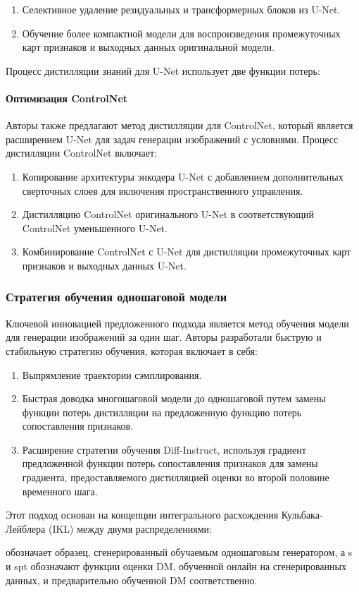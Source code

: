 \begin{enumerate}
    \item  Селективное удаление резидуальных и трансформерных блоков из U-Net.
    \item  Обучение более компактной модели для воспроизведения промежуточных карт признаков и выходных данных оригинальной модели.
\end{enumerate}

Процесс дистилляции знаний для U-Net использует две функции потерь:



\paragraph{Оптимизация ControlNet}

Авторы также предлагают метод дистилляции для ControlNet, который является расширением U-Net для задач генерации изображений с условиями. Процесс дистилляции ControlNet включает:

\begin{enumerate}
    \item Копирование архитектуры энкодера U-Net с добавлением дополнительных сверточных слоев для включения пространственного управления.
    \item Дистилляцию ControlNet оригинального U-Net в соответствующий ControlNet уменьшенного U-Net.
    \item Комбинирование ControlNet с U-Net для дистилляции промежуточных карт признаков и выходных данных U-Net.
\end{enumerate}

\subsubsection{Стратегия обучения одношаговой модели}

Ключевой инновацией предложенного подхода является метод обучения модели для генерации изображений за один шаг. Авторы разработали быструю и стабильную стратегию обучения, которая включает в себя:

\begin{enumerate}
    \item Выпрямление траектории сэмплирования.
    \item Быстрая доводка многошаговой модели до одношаговой путем замены функции потерь дистилляции на предложенную функцию потерь сопоставления признаков.
    \item Расширение стратегии обучения Diff-Instruct, используя градиент предложенной функции потерь сопоставления признаков для замены градиента, предоставляемого дистилляцией оценки во второй половине временного шага.
\end{enumerate}

Этот подход основан на концепции интегрального расхождения Кульбака-Лейблера (IKL) между двумя распределениями:

 обозначает образец, сгенерированный обучаемым одношаговым генератором, а s и spt обозначают функции оценки DM, обученной онлайн на сгенерированных данных, и предварительно обученной DM соответственно.
